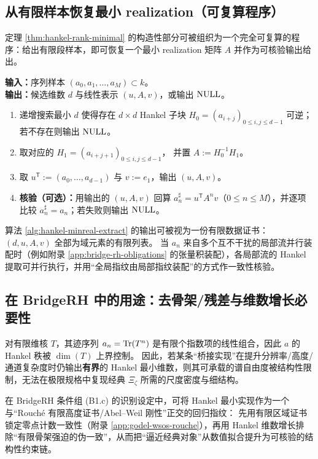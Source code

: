 \subsection{从有限样本恢复最小 realization（可复算程序）}\label{subsec:hankel-realization-protocol}
定理 \ref{thm:hankel-rank-minimal} 的构造性部分可被组织为一个完全可复算的程序：给出有限段样本，即可恢复一个最小 realization 矩阵 $A$ 并作为可核验输出给出。

\begin{algorithm}\label{alg:hankel-minreal-extract}
\textbf{输入：}序列样本 $(a_0,a_1,\dots,a_{M})\subset k$。\\
\textbf{输出：}候选维数 $d$ 与线性表示 $(u,A,v)$，或输出 $\mathrm{NULL}$。
\begin{enumerate}
  \item 递增搜索最小 $d$ 使得存在 $d\times d$ Hankel 子块
  $H_0=(a_{i+j})_{0\le i,j\le d-1}$
  可逆；若不存在则输出 $\mathrm{NULL}$。
  \item 取对应的
  $H_1=(a_{i+j+1})_{0\le i,j\le d-1}$，
  并置 $A:=H_0^{-1}H_1$。
  \item 取 $u^{\mathsf T}:=(a_0,\dots,a_{d-1})$ 与 $v:=e_1$，输出 $(u,A,v)$。
  \item \textbf{核验（可选）：}用输出的 $(u,A,v)$ 回算 $a_n^\sharp=u^{\mathsf T}A^n v$（$0\le n\le M$），并逐项比较 $a_n^\sharp=a_n$；若失败则输出 $\mathrm{NULL}$。
\end{enumerate}
\end{algorithm}

\begin{remark}[证书对象与并行性]
算法 \ref{alg:hankel-minreal-extract} 的输出可被视为一份有限数据证书：$(d,u,A,v)$ 全部为域元素的有限列表。
当 $a_n$ 来自多个互不干扰的局部流并行装配时（例如附录 \ref{app:bridge-rh-obligations} 的张量积装配），各局部流的 Hankel 提取可并行执行，并用“全局指纹由局部指纹装配”的方式作一致性核验。
\end{remark}

\subsection{在 BridgeRH 中的用途：去骨架/残差与维数增长必要性}\label{subsec:hankel-bridge-use}
\begin{remark}[有限维骨架假象的否证通道]\label{rem:hankel-skeleton-filter}
对有限维核 $T$，其迹序列 $a_n=\mathrm{Tr}(T^n)$ 是有限个指数项的线性组合，因此 $a$ 的 Hankel 秩被 $\dim(T)$ 上界控制。
因此，若某条“桥接实现”在提升分辨率/高度/通道复杂度时仍输出\textbf{有界}的 Hankel 最小维数，则其可承载的谱自由度被结构性限制，无法在极限规格中复现经典 $\Xi_\zeta$ 所需的尺度密度与细结构。
\par
在 BridgeRH 条件组 (B1.c) 的识别设定中，可将 Hankel 最小实现作为一个与“Rouch{\'e} 有限高度证书/Abel--Weil 刚性”正交的回归指纹：
先用有限区域证书锁定零点计数一致性（附录 \ref{app:godel-wsos-rouche}），再用 Hankel 维数增长排除“有限骨架强迫的伪一致”，从而把“逼近经典对象”从数值拟合提升为可核验的结构性约束链。
\end{remark}

